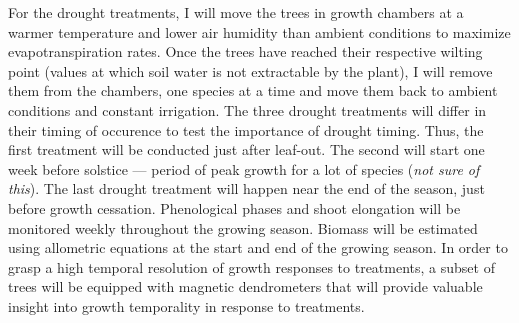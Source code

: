 \documentclass[12pt]{article}
\begin{document}
For the drought treatments, I will move the trees in growth chambers at a warmer temperature and lower air humidity than ambient conditions to maximize evapotranspiration rates. Once the trees have reached their respective wilting point (values at which soil water is not extractable by the plant), I will remove them from the chambers, one species at a time and move them back to ambient conditions and constant irrigation. The three drought treatments will differ in their timing of occurence to test the importance of drought timing. Thus, the first treatment will be conducted just after leaf-out. The second will start one week before solstice --- period of peak growth for a lot of species (\textit{not sure of this}). The last drought treatment will happen near the end of the season, just before growth cessation. Phenological phases and shoot elongation will be monitored weekly throughout the growing season. Biomass will be estimated using allometric equations at the start and end of the growing season. In order to grasp a high temporal resolution of growth responses to treatments, a subset of trees will be equipped with magnetic dendrometers that will provide valuable insight into growth temporality in response to treatments. \\
\end{document}
